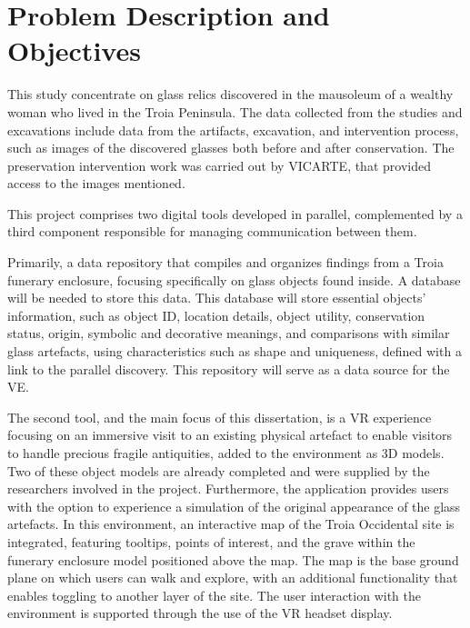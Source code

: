 
\section{Problem Description and Objectives}
\label{sec:problem_description} 
This study concentrate on glass relics discovered in the mausoleum of a wealthy woman who lived in the Troia Peninsula. The data collected from the studies and excavations include 
data from the artifacts, excavation, and intervention process, such as images of the discovered glasses both before and after conservation. 
The preservation intervention work was carried out by \gls{VICARTE}, that provided access to the images mentioned.

This project comprises two digital tools developed in parallel, complemented by a third component responsible for managing communication between them.

Primarily, a data repository that compiles and organizes findings from 
a Troia funerary enclosure, focusing specifically on glass objects found inside. A database will be needed to store this data. 
This database will store essential objects' information, such as object ID, location details, object utility,
conservation status, origin, symbolic and decorative meanings, and comparisons with similar glass artefacts, using characteristics such as shape and uniqueness, defined with a link to the parallel discovery. 
This repository will serve as a data source for the \gls{VE}.

The second tool, and the main focus of this dissertation, is a \gls{VR} experience focusing on an immersive visit to an existing physical 
artefact to enable visitors to handle precious fragile antiquities, added to the environment as \gls{3D} models. 
Two of these object models are already completed and were supplied by the researchers involved in the project.
Furthermore, the application provides users with the option to experience a simulation of the original appearance of the glass artefacts.
In this environment, an interactive map of the Troia Occidental site is integrated, featuring tooltips, points of interest, and the grave within the funerary enclosure model positioned above the map. 
The map is the base ground plane on which users can walk and explore, with an additional functionality that enables toggling to another layer of the site.
The user interaction with the environment is supported through the use of the \gls{VR} headset display.

